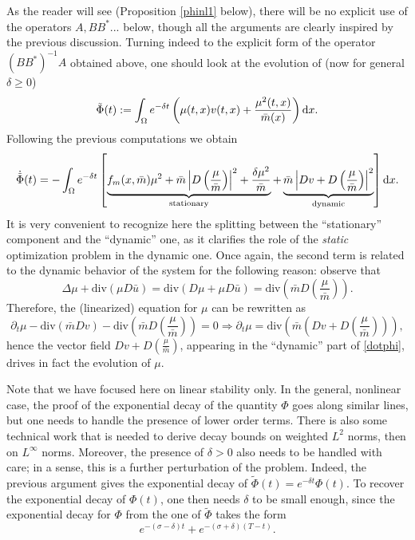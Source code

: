 \documentclass[10pt,a4paper,nouppercase,nowrite]{article}
\numberwithin{equation}{section}
\newcommand{\di}{{\rm d}}
\theoremstyle{definition}
\begin{document}
	As the reader will see (Proposition \ref{phinl1} below), there will be no explicit use of the operators $A, BB^*$... below, though all the arguments are clearly inspired by the previous discussion. %
	Turning indeed to the explicit form of the operator $(BB^*)^{-1}A$ obtained above, one should look at the evolution of (now for general $\delta \ge 0$)
	\begin{equation*}
		\tilde{\Phi}(t) := \int_{\Omega} e^{-\delta t} \left( \mu(t,x) v(t,x) + \frac{\mu^2(t,x)}{\bar{m}(x)} \right) \di x.
	\end{equation*}
	Following the previous computations we obtain
	\begin{equation}
			\dot{\tilde{\Phi}}(t) = - \int_{\Omega} e^{-\delta t} \left[ \underbrace{f_{m}(x,\bar{m}) \mu^2 + \bar{m}\left| D\left( \frac{\mu}{\bar{m}} \right) \right|^2 + \frac{\delta \mu^2}{\bar{m}}}_{\text{stationary}} + \underbrace{\bar{m}\left|Dv + D\left( \frac{\mu}{\bar{m}} \right) \right|^2}_{\text{dynamic}} \right] \di x.
		\label{dotphi}
	\end{equation}
	It is very convenient to recognize here the splitting between the ``stationary'' component and the ``dynamic'' one, as it clarifies the role of the \textit{static} optimization problem in the dynamic one. Once again, the second term is related to the dynamic behavior of the system for the following reason: observe that
		\begin{equation*}
			\Delta \mu + \text{div}(\mu D\bar{u}) = \text{div}(D\mu + \mu D\bar{u}) = \text{div}\left( \bar{m} D \left( \frac{\mu}{\bar{m}} \right) \right).
		\end{equation*}
		Therefore, the (linearized) equation for $\mu$ can be rewritten as
		\begin{equation*}
			\partial_t \mu - \text{div}(\bar{m}Dv) - \text{div}\left( \bar{m} D \left( \frac{\mu}{\bar{m}} \right) \right) = 0 \Longrightarrow \partial_t \mu = \text{div}\left(\bar{m}\left( Dv+D \left( \frac{\mu}{\bar{m}} \right) \right) \right),
		\end{equation*}
		hence the vector field $Dv + D \left( \frac{\mu}{\bar{m}} \right)$, appearing in the ``dynamic'' part of \eqref{dotphi}, drives in fact the evolution of $\mu$. 
	
	Note that we have focused here on linear stability only. In the general, nonlinear case, the proof of the exponential decay of the quantity $\Phi$ goes along similar lines, but one needs to handle the presence of lower order terms. There is also some technical work that is needed to derive decay bounds on weighted $L^2$ norms, then on $L^\infty$ norms. Moreover, the presence of $\delta > 0$ also needs to be handled with care; in a sense, this is a further perturbation of the problem. Indeed, the previous argument gives the exponential decay of $\tilde \Phi(t) = e^{-\delta t} \Phi(t)$. To recover the exponential decay of $\Phi(t)$, one then needs $\delta$ to be small enough, since the exponential decay for $\Phi$ from the one of $\tilde \Phi$ takes the form
\[
e^{-(\sigma-\delta) t} +  e^{-(\sigma+\delta) (T-t)}.
\]
\end{document}
